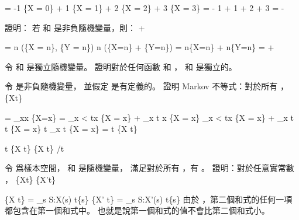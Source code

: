 \startformula\startmathalignment
\NC \E[X] \NC = -1 \cdot \Pr\{X = 0\} +
             1 \cdot \Pr\{X = 1\} +
             2 \cdot \Pr\{X = 2\} +
             3 \cdot \Pr\{X = 3\} \NR
\NC \NC = - 1 \cdot {}
            + 1 \cdot {}
            + 2 \cdot {}
            + 3 \cdot {} \NR
\NC \NC = -  \NR
\NC \NC {} \NR
\stopmathalignment\stopformula
\stopANSWER

\startEXERCISE
證明：
若  和  是非負隨機變量，則：
\startformula
\E[\max(X,Y)] \le \E[X] + \E[Y]
\stopformula
\stopEXERCISE

\startANSWER
\startformula\startmathalignment
\NC \E[\max(X, Y)] \NC = \sum n \cdot \max(\Pr\{X = n\}, \Pr\{Y = n\}) \NR
\NC \NC \le \sum n \cdot (\Pr\{X=n\} + \Pr\{Y=n\}) \NR
\NC \NC = \sum n\cdot \Pr\{X=n\} + \sum n\cdot \Pr\{Y=n\} \NR
\NC \NC = \E[X] + \E[Y] \NR
\stopmathalignment\stopformula
\stopANSWER

\startEXERCISE\DIFFICULT
令  和  是獨立隨機變量。
證明對於任何函數  和 ，
  和  是獨立的。
\stopEXERCISE

\startANSWER
{}
\stopANSWER

\startEXERCISE\DIFFICULT
令  是非負隨機變量，
並假定 \m{\E[X]} 是有定義的。
證明 {\EMP Markov 不等式}：對於所有 ，
\startformula
\Pr\{X\ge t\}\le {} 
\stopformula
\stopEXERCISE

\startANSWER
\startformula\startmathalignment
\NC \E[X] \NC = \sum_{x}x \cdot \Pr\{X=x\} \NR
\NC \NC = \sum_{x < t}x \cdot \Pr\{X = x\} + \sum_{x \ge t} x \cdot \Pr\{X = x\} \NR
\NC \NC \ge \sum_{x < t}x \cdot \Pr\{X = x\} + \sum_{x \ge t} t \cdot \Pr\{X = x\} \NR
\NC \NC \ge t \sum_{x \ge t} \Pr\{X = x\} \NR
\NC \NC = t \cdot \Pr\{X \ge t\} \NR
\stopmathalignment\stopformula

\startformula\startmathalignment[n=1]
\NC \E[X] \ge t \cdot \Pr\{X \ge t\} \NR
\NC \Downarrow \NR
\NC \Pr\{X \ge t\} \le \E[X]/t \NR
\stopmathalignment\stopformula
\stopANSWER

\startEXERCISE[exercise:C.3-7]\DIFFICULT
令  爲樣本空間，  和  是隨機變量，
滿足對於所有 ，有 。
證明：對於任意實常數 ，
\startformula
\Pr\{X\ge t\} \ge \Pr\{X'\ge t\}
\stopformula
\stopEXERCISE

\startANSWER
\startformula\startmathalignment
\NC \Pr\{X \ge t\} \NC = \sum_{s \in S:X(s) \ge t}\Pr\{s\} \NR
\NC \Pr\{X' \ge t\} \NC = \sum_{s \in S:X'(s) \ge t}\Pr\{s\} \NR
\stopmathalignment\stopformula
由於 ，第二個和式的任何一項都包含在第一個和式中。
也就是說第一個和式的值不會比第二個和式小。
\stopANSWER

